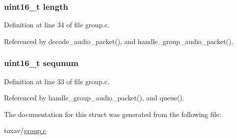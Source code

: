 \hypertarget{struct_group___audio___packet_a1892eba2086d12ac2b09005aeb09ea3b}{
\subsubsection[{length}]{\setlength{\rightskip}{0pt plus 5cm}uint16\+\_\+t length}}\label{struct_group___audio___packet_a1892eba2086d12ac2b09005aeb09ea3b}


Definition at line 34 of file group.\+c.



Referenced by decode\+\_\+audio\+\_\+packet(), and handle\+\_\+group\+\_\+audio\+\_\+packet().

\hypertarget{struct_group___audio___packet_afe208c7dec97b8f61e08094e61bf096e}{
\subsubsection[{sequnum}]{\setlength{\rightskip}{0pt plus 5cm}uint16\+\_\+t sequnum}}\label{struct_group___audio___packet_afe208c7dec97b8f61e08094e61bf096e}


Definition at line 33 of file group.\+c.



Referenced by handle\+\_\+group\+\_\+audio\+\_\+packet(), and queue().



The documentation for this struct was generated from the following file\+:\begin{DoxyCompactItemize}
\item 
toxav/\hyperlink{toxav_2group_8c}{group.\+c}\end{DoxyCompactItemize}
